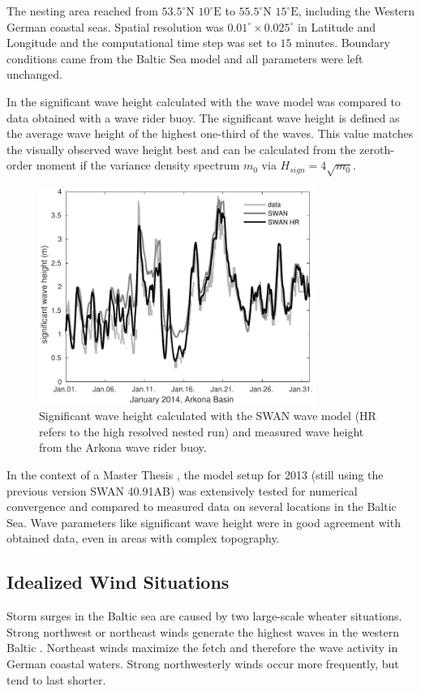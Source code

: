 The nesting area reached from $53.5^\circ \text{N } 10^\circ \text{E}$ to 
$55.5^\circ \text{N } 15^\circ \text{E}$, including the Western German coastal 
seas. Spatial resolution was $0.01^\circ \times 0.025^\circ $ in Latitude and 
Longitude and the computational time step was set to $15$ minutes. Boundary 
conditions came from the Baltic Sea model and all parameters were left 
unchanged.

In  the significant wave height calculated with the wave model was 
compared to data obtained with a wave rider buoy. The significant wave height 
is defined as the average wave height of the highest one-third of the waves. 
This value matches the visually observed wave height best and can be calculated 
from the zeroth-order moment if the variance density spectrum $m_0$ via 
$H_{sign} = 4 \sqrt{m_0}$.
\begin{figure}[ht]
 \includegraphics[width=9cm]{bilder/januar.pdf}
 \caption{Significant wave height calculated with the SWAN wave model (HR 
refers to the high resolved nested run) and measured wave height from the 
Arkona wave rider buoy.\label{verify}}
\end{figure}

In the context of a Master Thesis \citep[][]{masterarbeitronja}, the model 
setup for 2013 (still using the previous version SWAN 40.91AB) was 
extensively tested for numerical convergence and compared to measured data on 
several locations in the Baltic Sea. Wave parameters like significant wave 
height were in good agreement with obtained data, even in areas with complex 
topography.

\subsection{Idealized Wind Situations}

Storm surges in the Baltic sea are caused by two large-scale wheater 
situations. Strong northwest or northeast winds generate the highest 
waves in the western Baltic \citep[][]{balticsea}. Northeast winds maximize the 
fetch and therefore the wave activity in German coastal waters. Strong 
northwesterly winds occur more frequently, but tend to last shorter. 

